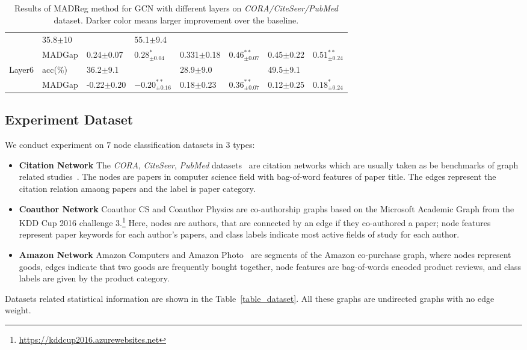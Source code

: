 \documentclass[letterpaper]{article} \usepackage{aaai20}  \usepackage{times}  \usepackage{helvet} \usepackage{courier}  \usepackage[hyphens]{url}  \usepackage{graphicx} \urlstyle{rm} \def\UrlFont{\rm}  \frenchspacing  \setlength{\pdfpagewidth}{8.5in}  \setlength{\pdfpageheight}{11in}  \setcounter{secnumdepth}{0}
\newcommand{\citep}{\cite}
\begin{document}
\begin{table*}[t]
{\begin{tabular}{l|l|ll|ll|ll}
      & 35.8\tiny$\pm$10     & \cellcolor{deep_red}{$46.5^{**}_{\pm7.7}$}    
      & 55.1\tiny$\pm$9.4    & \cellcolor{deep_red}{$56.1^{**}_{\pm9.6}$}  \\
      & MADGap  
      & 0.24\tiny$\pm$0.07   & {$0.28^{*}_{\pm0.04}$}
      & 0.331\tiny$\pm$0.18  & {$0.46^{**}_{\pm0.07}$} 
      & 0.45\tiny$\pm$0.22   & {$0.51^{**}_{\pm0.24}$}       \\ \hline
Layer6 & acc(\%) 
      & 36.2\tiny$\pm$9.1    & \cellcolor{deep_red}{$38.5^{**}_{\pm8.2}$}
      & 28.9\tiny$\pm$9.0    & \cellcolor{deep_red}{$37.5^{**}_{\pm4.7}$}   
      & 49.5\tiny$\pm$9.1    & \cellcolor{deep_red}{$52.3^{**}_{\pm10.5}$}   \\
      & MADGap  
      & -0.22\tiny$\pm$0.20  & {$-0.20^{**}_{\pm0.16}$}
      & 0.18\tiny$\pm$0.23   & {$0.36^{**}_{\pm0.07}$}
      &   0.12\tiny$\pm$0.25 &{$0.18^{*}_{\pm0.24}$}           \\ \hline
\end{tabular}}
\caption{Results of MADReg method for GCN with different layers on \textit{CORA/CiteSeer/PubMed} dataset. Darker color means larger improvement over the baseline.}

\label{table_reg_result2}
\end{table*}

\subsection{Experiment Dataset}
We conduct experiment on $7$ node classification datasets in $3$ types:
\begin{itemize}
    \item \textbf{Citation Network} The \textit{CORA}, \textit{CiteSeer}, \textit{PubMed} datasets~\citep{dataset_real_ccp} are citation networks which are usually taken as be benchmarks of graph related studies~\citep{analysis_smoothing,analysis_lowpass}. The nodes are papers in computer science field with bag-of-word features of paper title. The edges represent the citation relation amaong papers and the label is paper category.
    \item \textbf{Coauthor Network} Coauthor CS and Coauthor Physics are co-authorship graphs based on the Microsoft Academic Graph from the KDD Cup 2016 challenge 3.\footnote{\url{https://kddcup2016.azurewebsites.net} } Here, nodes are authors, that are connected by an edge if they co-authored a paper; node features represent paper keywords for each author’s papers, and class labels indicate most active fields of study for each author.
    \item \textbf{Amazon Network} Amazon Computers and Amazon Photo~\citep{dataset_real_amazon} are segments of the Amazon co-purchase graph, where nodes represent goods, edges indicate that two goods are frequently bought together, node features are bag-of-words encoded product reviews, and class labels are given by the product category.
\end{itemize}
Datasets related statistical information are shown  in the Table~\ref{table_dataset}. All these graphs are undirected graphs with no edge weight.
\end{document}
